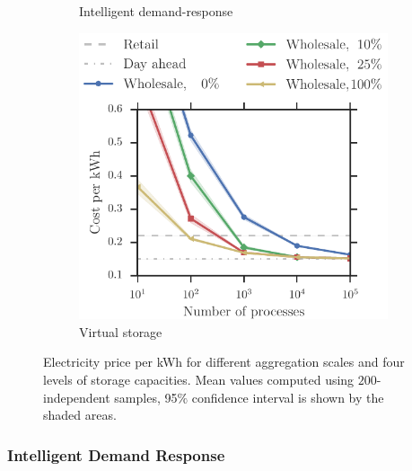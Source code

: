 \documentclass[conference]{IEEEtran}
\begin{document}
\begin{figure}[t!]
\begin{subfigure}[b]{0.32\textwidth}
        \caption{Intelligent demand-response}
       \label{fig:wholesale_flex}
    \end{subfigure}
    \begin{subfigure}[b]{0.32\textwidth}
        \includegraphics[width=1.0\textwidth]{figures/Wholesale_betweenDay.pdf}
        \caption{Virtual storage}
        \label{fig:wholesale_betweenDay}
    \end{subfigure}
    \vspace{-0.4cm}
\caption{Electricity price per kWh for different aggregation scales and four levels of storage capacities. Mean values computed using $200$-independent samples, 95$\%$ confidence interval is shown by the shaded areas.}
\end{figure}

\subsubsection{Intelligent Demand Response}
\end{document}
